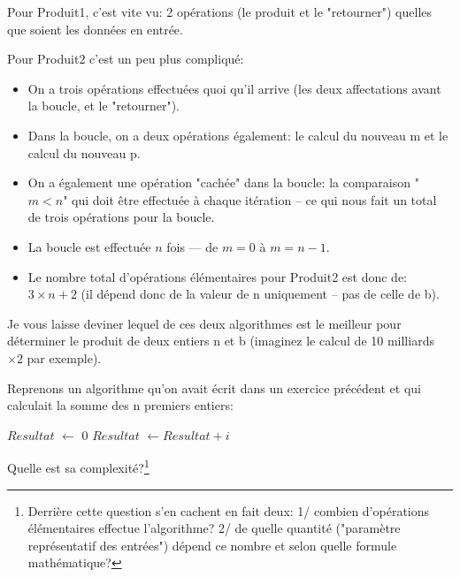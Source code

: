 \documentclass[12pt]{article}
\begin{document}
	\begin{MaReponse}
		Pour Produit1, c'est vite vu: 2 opérations (le produit et le "retourner") quelles que soient les données en entrée.
		
		Pour Produit2 c'est un peu plus compliqué:
		\begin{itemize}
			\item On a trois opérations effectuées quoi qu'il arrive (les deux affectations avant la boucle, et le "retourner").
			\item Dans la boucle, on a deux opérations également: le calcul du nouveau m et le calcul du nouveau p.
			\item On a également une opération "cachée" dans la boucle: la comparaison "$m < n$" qui doit être effectuée à chaque itération -- ce qui nous fait un total de trois opérations pour la boucle.
			\item La boucle est effectuée $n$ fois --- de $m = 0$ à $m = n - 1$.
			\item Le nombre total d'opérations élémentaires pour Produit2 est donc de: $3 \times n + 2$ (il dépend donc de la valeur de n uniquement -- pas de celle de b).
		\end{itemize}
		
		Je vous laisse deviner lequel de ces deux algorithmes est le meilleur pour déterminer le produit de deux entiers n et b (imaginez le calcul de 10 milliards $\times 2$ par exemple).
			
	\end{MaReponse}

		\begin{MonExo}
		Reprenons un algorithme qu'on avait écrit dans un exercice précédent et qui calculait la somme des n premiers entiers:
		
		\begin{algorithmic}
			\State $Resultat$ $\leftarrow$ 0
			\State $Resultat$ $\leftarrow Resultat + i$
			\EndFor
			\State{}
			\EndFunction
		\end{algorithmic}
		\vspace{\baselineskip}
		Quelle est sa complexité?\footnote{Derrière cette question s'en cachent en fait deux: 1/ combien d'opérations élémentaires effectue l'algorithme? 2/ de quelle quantité ("paramètre représentatif des entrées") dépend ce nombre et selon quelle formule mathématique?}
	\end{MonExo}
	
\end{document}
